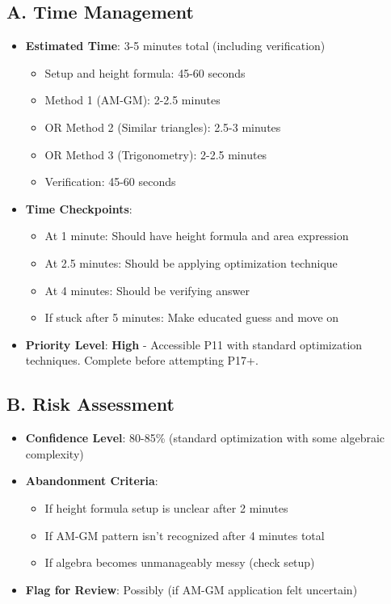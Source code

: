 \documentclass[12pt]{article}
\begin{document}
\begin{competitionbox}
\subsection*{A. Time Management}
\begin{itemize}[leftmargin=*]
    \item \textbf{Estimated Time}: 3-5 minutes total (including verification)
    \begin{itemize}
        \item Setup and height formula: 45-60 seconds
        \item Method 1 (AM-GM): 2-2.5 minutes
        \item OR Method 2 (Similar triangles): 2.5-3 minutes
        \item OR Method 3 (Trigonometry): 2-2.5 minutes
        \item Verification: 45-60 seconds
    \end{itemize}
    \item \textbf{Time Checkpoints}: 
    \begin{itemize}
        \item At 1 minute: Should have height formula and area expression
        \item At 2.5 minutes: Should be applying optimization technique
        \item At 4 minutes: Should be verifying answer
        \item If stuck after 5 minutes: Make educated guess and move on
    \end{itemize}
    \item \textbf{Priority Level}: \textbf{High} - Accessible P11 with standard optimization techniques. Complete before attempting P17+.
\end{itemize}

\subsection*{B. Risk Assessment}
\begin{itemize}[leftmargin=*]
    \item \textbf{Confidence Level}: 80-85\% (standard optimization with some algebraic complexity)
    \item \textbf{Abandonment Criteria}: 
    \begin{itemize}
        \item If height formula setup is unclear after 2 minutes
        \item If AM-GM pattern isn't recognized after 4 minutes total
        \item If algebra becomes unmanageably messy (check setup)
    \end{itemize}
    \item \textbf{Flag for Review}: Possibly (if AM-GM application felt uncertain)
\end{itemize}


\end{competitionbox}
\end{document}
